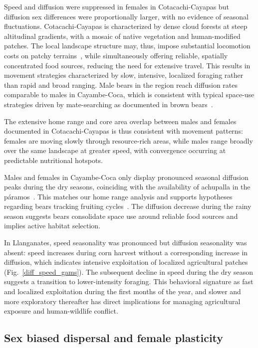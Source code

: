\documentclass[lineno,referee,pdflatex,sn-vancouver-num]{sn-jnl}%
\theoremstyle{thmstyleone}%
\theoremstyle{thmstyletwo}%
\theoremstyle{thmstylethree}%
\begin{document}
Speed and diffusion were suppressed in females in Cotacachi-Cayapas but diffusion sex differences were proportionally larger, with no evidence of seasonal fluctuations. Cotacachi-Cayapas is characterized by dense cloud forests at steep altitudinal
gradients, with a mosaic of native vegetation and human-modified patches. The local landscape structure may, thus, impose substantial locomotion costs on patchy terrains~\cite{halseyTerrestrialMovementEnergetics2016}, while simultaneously offering reliable, spatially concentrated food sources, reducing the need for extensive travel.
This results in movement strategies characterized by slow, intensive, localized foraging rather than rapid and broad ranging. Male bears in the region reach diffusion rates comparable to males in Cayambe-Coca, which is consistent with typical space-use strategies driven by mate-searching as documented in brown bears~\cite{dahleSeasonalRangeSize2003}.

The extensive home range and core area overlap between males and females documented in Cotacachi-Cayapas is thus consistent with movement patterns: females are moving slowly through resource-rich areas, while males range broadly over the same landscape at greater speed, with convergence occurring at predictable nutritional hotspots.

Males and females in Cayambe-Coca only display pronounced seasonal diffusion peaks during the dry seasons, coinciding with the availability of achupalla in the páramos~\cite{chavezSeasonalityAndeanBear2021}. This matches our home range analysis and supports hypotheses regarding bears tracking fruiting cycles~\cite{peytonEcologyDistributionFood1980}. The diffusion decrease during the rainy season suggests bears consolidate space use around reliable food sources and implies active habitat selection.

In Llanganates, speed seasonality was pronounced but diffusion seasonality was absent: speed increases during corn harvest without a corresponding increase in diffusion, which indicates intensive exploitation of localized agricultural patches (Fig.~\ref{diff_speed_gams}). The subsequent decline in speed during the dry season suggests a transition to lower-intensity foraging. This behavioral signature as fast and localized exploitation during the first months of the year, and slower and more exploratory thereafter has direct implications for managing agricultural exposure and human-wildlife conflict.

\subsection{Sex biased dispersal and female plasticity}
\end{document}
